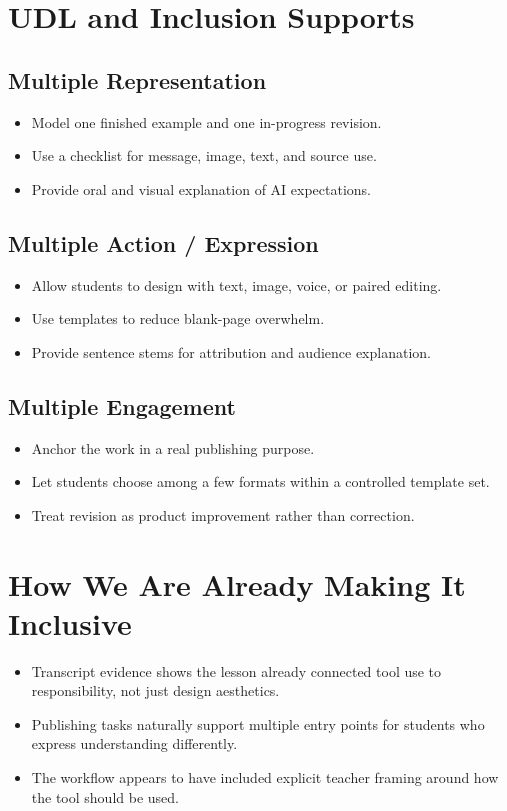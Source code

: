 \documentclass[11pt]{article}
\begin{document}
\section*{UDL and Inclusion Supports}
\subsection*{Multiple Representation}
\begin{itemize}[leftmargin=*]
\item Model one finished example and one in-progress revision.
\item Use a checklist for message, image, text, and source use.
\item Provide oral and visual explanation of AI expectations.
\end{itemize}

\subsection*{Multiple Action / Expression}
\begin{itemize}[leftmargin=*]
\item Allow students to design with text, image, voice, or paired editing.
\item Use templates to reduce blank-page overwhelm.
\item Provide sentence stems for attribution and audience explanation.
\end{itemize}

\subsection*{Multiple Engagement}
\begin{itemize}[leftmargin=*]
\item Anchor the work in a real publishing purpose.
\item Let students choose among a few formats within a controlled template set.
\item Treat revision as product improvement rather than correction.
\end{itemize}

\section*{How We Are Already Making It Inclusive}
\begin{itemize}[leftmargin=*]
\item Transcript evidence shows the lesson already connected tool use to responsibility, not just design aesthetics.
\item Publishing tasks naturally support multiple entry points for students who express understanding differently.
\item The workflow appears to have included explicit teacher framing around how the tool should be used.
\end{itemize}
\end{document}
